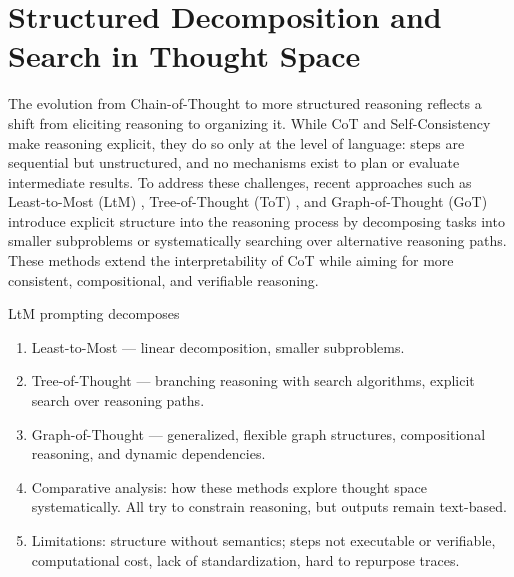 \documentclass[project]{bsu-cs}  %
\begin{document}
\section{Structured Decomposition and Search in Thought Space}\label{sec:decomp}
% 
The evolution from Chain-of-Thought to more structured reasoning reflects a shift from eliciting reasoning to organizing it. While CoT and Self-Consistency make reasoning explicit, they do so only at the level of language: steps are sequential but unstructured, and no mechanisms exist to plan or evaluate intermediate results. To address these challenges, recent approaches such as Least-to-Most (LtM) \citep{zhou2023leasttomostpromptingenablescomplex}, Tree-of-Thought (ToT) \citep{yao2023treethoughtsdeliberateproblem}, and Graph-of-Thought (GoT) \citep{Besta_2024} introduce explicit structure into the reasoning process by decomposing tasks into smaller subproblems or systematically searching over alternative reasoning paths. These methods extend the interpretability of CoT while aiming for more consistent, compositional, and verifiable reasoning.

LtM prompting decomposes 

\begin{enumerate}
    \item Least-to-Most \citep{zhou2023leasttomostpromptingenablescomplex} — linear decomposition, smaller subproblems.

    \item Tree-of-Thought \citep{yao2023treethoughtsdeliberateproblem} — branching reasoning with search algorithms, explicit search over reasoning paths.

    \item Graph-of-Thought \citep{Besta_2024} — generalized, flexible graph structures, compositional reasoning, and dynamic dependencies.

    \item Comparative analysis: how these methods explore thought space systematically. All try to constrain reasoning, but outputs remain text-based.

    \item Limitations: structure without semantics; steps not executable or verifiable, computational cost, lack of standardization, hard to repurpose traces.

\end{enumerate}
\end{document}
